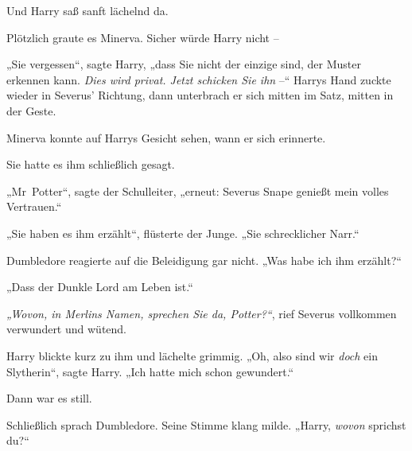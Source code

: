 Und Harry saß sanft lächelnd da. 

Plötzlich graute es Minerva. Sicher würde Harry nicht – 

„Sie vergessen“, sagte Harry, „dass Sie nicht der einzige sind, der Muster erkennen kann. \emph{Dies wird privat. Jetzt schicken Sie ihn} –“ Harrys Hand zuckte wieder in Severus’ Richtung, dann unterbrach er sich mitten im Satz, mitten in der Geste. 

Minerva konnte auf Harrys Gesicht sehen, wann er sich erinnerte. 

Sie hatte es ihm schließlich gesagt. 

„Mr~Potter“, sagte der Schulleiter, „erneut: Severus Snape genießt mein volles Vertrauen.“ 

„Sie haben es ihm erzählt“, flüsterte der Junge. „Sie schrecklicher Narr.“ 

Dumbledore reagierte auf die Beleidigung gar nicht. „Was habe ich ihm erzählt?“ 

„Dass der Dunkle Lord am Leben ist.“ 

\emph{„Wovon, in Merlins Namen, sprechen Sie da, Potter?“}, rief Severus vollkommen verwundert und wütend. 

Harry blickte kurz zu ihm und lächelte grimmig. „Oh, also sind wir \emph{doch} ein Slytherin“, sagte Harry. „Ich hatte mich schon gewundert.“ 

Dann war es still. 

Schließlich sprach Dumbledore. Seine Stimme klang milde. „Harry, \emph{wovon} sprichst du?“ 

